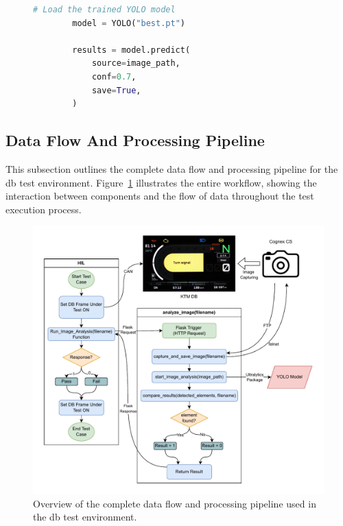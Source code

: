 \begin{figure}
    \begin{lstlisting}[language=Python, caption={Running model prediction on a given image using Ultralytics functions}, label={lst:model_predict_only}]
        # Load the trained YOLO model
        model = YOLO("best.pt")
    
        results = model.predict(
            source=image_path,
            conf=0.7,
            save=True,
        )
    \end{lstlisting}
\end{figure}




\subsection{Data Flow And Processing Pipeline}

This subsection outlines the complete data flow and processing pipeline for the \gls{db} test environment. Figure~\ref{Complete_process} illustrates the entire workflow, showing the interaction between components and the flow of data throughout the test execution process.

\begin{figure}[!ht]
    \centering
    \includegraphics[width=\textwidth]{Figures/diagrams/Complete_Process (1).pdf}
    \caption{Overview of the complete data flow and processing pipeline used in the \gls{db} test environment.}
    \label{Complete_process}
\end{figure}

